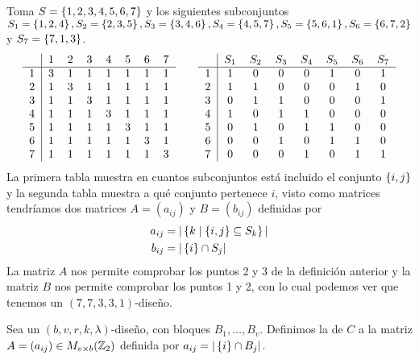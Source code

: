 \begin{example}
	Toma $S=\left\{1, 2, 3, 4, 5, 6, 7\right\}$ y los siguientes subconjuntos $S_1=\left\{1, 2, 4\right\}, S_2=\left\{2, 3, 5\right\}, S_3=\left\{3, 4, 6\right\}, S_4=\left\{4, 5, 7\right\}, S_5=\left\{5, 6, 1\right\}, S_6=\left\{6, 7, 2\right\}$ y $S_7=\left\{7, 1, 3\right\}$.
	\[
		\begin{tabular}{c|ccccccc}
			& 1 & 2 & 3 & 4 & 5 & 6 & 7\\
			\hline
			1& 3 & 1 & 1 & 1 & 1 & 1 & 1\\
			2& 1 & 3 & 1 & 1 & 1 & 1 & 1\\
			3& 1 & 1 & 3 & 1 & 1 & 1 & 1\\
			4& 1 & 1 & 1 & 3 & 1 & 1 & 1\\
			5& 1 & 1 & 1 & 1 & 3 & 1 & 1\\
			6& 1 & 1 & 1 & 1 & 1 & 3 & 1\\
			7& 1 & 1 & 1 & 1 & 1 & 1 & 3
		\end{tabular}
		\qquad
		\begin{tabular}{c|ccccccc}
			& $S_1$ & $S_2$ & $S_3$ & $S_4$ & $S_5$ & $S_6$ & $S_7$\\
			\hline
			1& 1 & 0 & 0 & 0 & 1 & 0 & 1\\
			2& 1 & 1 & 0 & 0 & 0 & 1 & 0\\
			3& 0 & 1 & 1 & 0 & 0 & 0 & 1\\
			4& 1 & 0 & 1 & 1 & 0 & 0 & 0\\
			5& 0 & 1 & 0 & 1 & 1 & 0 & 0\\
			6& 0 & 0 & 1 & 0 & 1 & 1 & 0\\
			7& 0 & 0 & 0 & 1 & 0 & 1 & 1
		\end{tabular}
	\]
	La primera tabla muestra en cuantos subconjuntos está incluido el conjunto $\left\{i,j\right\}$ y la segunda tabla muestra a qué conjunto pertenece $i$, visto como matrices tendríamos dos matrices $A=(a_{ij})$ y $B=(b_{ij})$ definidas por
	\begin{align*}
		a_{ij} & =|\left\{k\mid \left\{i,j\right\}\subseteq S_k\right\}|\\
		b_{ij} & =|\left\{i\right\}\cap S_j|
	\end{align*}
	La matriz $A$ nos permite comprobar los puntos 2 y 3 de la definición anterior y la matriz $B$ nos permite comprobar los puntos 1 y 2, con lo cual podemos ver que tenemos un $(7, 7, 3, 3, 1)$-diseño.
\end{example}

\begin{definition}
	Sea un $(b, v, r, k, \lambda)$-diseño, con bloques $B_1,\dots, B_v$.
	Definimos la  de $C$ a la matriz $A=(a_{ij})\in M_{v\times b}(\mathbb{Z}_2)$ definida por $a_{ij} = |\left\{i\right\}\cap B_j|$.
\end{definition}

